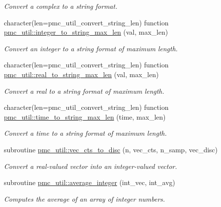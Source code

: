 \begin{DoxyCompactItemize}
\begin{DoxyCompactList}\small\item\em Convert a complex to a string format. \end{DoxyCompactList}\item 
character(len=pmc\+\_\+util\+\_\+convert\+\_\+string\+\_\+len) function \mbox{\hyperlink{namespacepmc__util_a702884cdee8fa1da41a3bf8b460c95d3}{pmc\+\_\+util\+::integer\+\_\+to\+\_\+string\+\_\+max\+\_\+len}} (val, max\+\_\+len)
\begin{DoxyCompactList}\small\item\em Convert an integer to a string format of maximum length. \end{DoxyCompactList}\item 
character(len=pmc\+\_\+util\+\_\+convert\+\_\+string\+\_\+len) function \mbox{\hyperlink{namespacepmc__util_a25918c31f5ac5a5497993883e1206308}{pmc\+\_\+util\+::real\+\_\+to\+\_\+string\+\_\+max\+\_\+len}} (val, max\+\_\+len)
\begin{DoxyCompactList}\small\item\em Convert a real to a string format of maximum length. \end{DoxyCompactList}\item 
character(len=pmc\+\_\+util\+\_\+convert\+\_\+string\+\_\+len) function \mbox{\hyperlink{namespacepmc__util_aa8c823006029e4a59872cb3f1e14bc70}{pmc\+\_\+util\+::time\+\_\+to\+\_\+string\+\_\+max\+\_\+len}} (time, max\+\_\+len)
\begin{DoxyCompactList}\small\item\em Convert a time to a string format of maximum length. \end{DoxyCompactList}\item 
subroutine \mbox{\hyperlink{namespacepmc__util_a90ce2db27a1927738cbef385c5f6decb}{pmc\+\_\+util\+::vec\+\_\+cts\+\_\+to\+\_\+disc}} (n, vec\+\_\+cts, n\+\_\+samp, vec\+\_\+disc)
\begin{DoxyCompactList}\small\item\em Convert a real-\/valued vector into an integer-\/valued vector. \end{DoxyCompactList}\item 
subroutine \mbox{\hyperlink{namespacepmc__util_a48e55ceb55e57898081b2b0221caa856}{pmc\+\_\+util\+::average\+\_\+integer}} (int\+\_\+vec, int\+\_\+avg)
\begin{DoxyCompactList}\small\item\em Computes the average of an array of integer numbers. \end{DoxyCompactList}\item 

\end{DoxyCompactItemize}
